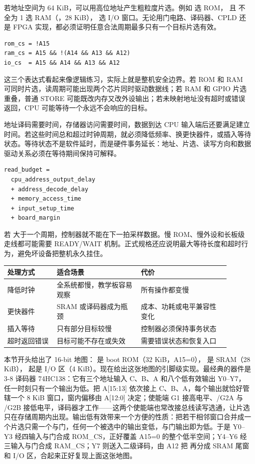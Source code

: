 若地址空间为 64 KiB，可以用高位地址产生粗粒度片选。例如  选 ROM， 且  不全为 1 选 RAM（，28 KiB）， 选 I/O 窗口。无论用门电路、译码器、CPLD 还是 FPGA 实现，都必须证明任意合法周期最多只有一个目标片选有效。

\begin{lstlisting}
rom_cs = !A15
ram_cs = A15 && !(A14 && A13 && A12)
io_cs  = A15 && A14 && A13 && A12
\end{lstlisting}

这三个表达式看起来像逻辑练习，实际上就是整机安全边界。若 ROM 和 RAM 可同时片选，读周期可能出现两个芯片同时驱动数据线；若 RAM 和 GPIO 片选重叠，普通 STORE 可能既改内存又改外设输出；若未映射地址没有超时或错误返回，CPU 可能等待一个永远不会响应的目标。

地址译码需要时间，存储器访问需要时间，数据到达 CPU 输入端后还要满足建立时间。若这些时间总和超过时钟周期，就必须降低频率、换更快器件，或插入等待状态。等待状态不是软件延时，而是硬件事务延长：地址、片选、读写方向和数据驱动关系必须在等待期间保持可解释。

\begin{lstlisting}
read_budget =
  cpu_address_output_delay
  + address_decode_delay
  + memory_access_time
  + input_setup_time
  + board_margin
\end{lstlisting}

若  大于一个周期，控制器就不能在下一拍采样数据。慢 ROM、慢外设和长板级走线都可能需要 READY/WAIT 机制。正式规格还应说明最大等待长度和超时行为，避免坏设备把整机永久挂住。

\begin{longtable}{L{0.2\linewidth}L{0.34\linewidth}L{0.36\linewidth}}
\toprule
处理方式 & 适合场景 & 代价 \\
\midrule
降低时钟 & 全系统都慢，教学板容易观察 & 所有操作都变慢 \\\tablerowrule
更快器件 & SRAM 或译码器成为瓶颈 & 成本、功耗或电平兼容性变化 \\\tablerowrule
插入等待 & 只有部分目标较慢 & 控制器必须保持事务状态 \\\tablerowrule
超时返回错误 & 目标可能不存在或失效 & 需要错误状态和恢复入口 \\
\bottomrule
\end{longtable}

本节开头给出了 16-bit 地图： 是 boot ROM（32 KiB，A15=0）， 是 SRAM（28 KiB）， 起是 I/O 区（4 KiB）。现在给出这张地图的引脚级实现。最经典的器件是 3-8 译码器 74HC138：它有三个地址输入 C、B、A 和八个低有效输出 Y0--Y7，任一时刻只有一个输出为低。把 A[15:13] 依次接上 C、B、A，每个输出就恰好管辖一个 8 KiB 窗口，窗内偏移由 A[12:0] 决定；使能端 G1 接高电平、/G2A 与 /G2B 接低电平，译码器才工作——这两个使能端也常改接总线读写选通，让片选只在存储周期内出现。输出低有效带来一个方便的性质：把若干相邻窗口合并成一个片选只需一个与门，任何一个被选中的输出变低，与门输出即为低。于是 Y0--Y3 经四输入与门合成 ROM\_CS，正好覆盖 A15=0 的整个低半空间；Y4--Y6 经三输入与门合成 RAM\_CS；Y7 则送入二级译码，由 A12 把  再分成 SRAM 尾窗和 I/O 区，合起来正好复现上面这张地图。

